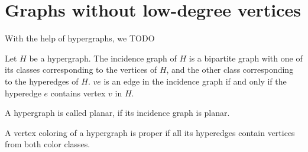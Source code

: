 \section{Graphs without low-degree vertices}
With the help of hypergraphs, we TODO

\begin{definition}
  Let $H$ be a hypergraph. The incidence graph of $H$ is a bipartite graph with one of
  its classes corresponding to the vertices of $H$, and the other class corresponding to
  the hyperedges of $H$. $ve$ is an edge in the incidence graph if and only if the
  hyperedge $e$ contains vertex $v$ in $H$.
\end{definition}
\begin{definition}
  A hypergraph is called planar, if its incidence graph is planar.
\end{definition}
\begin{definition}
  A vertex coloring of a hypergraph is proper if all its hyperedges contain vertices
  from both color classes.
\end{definition}

